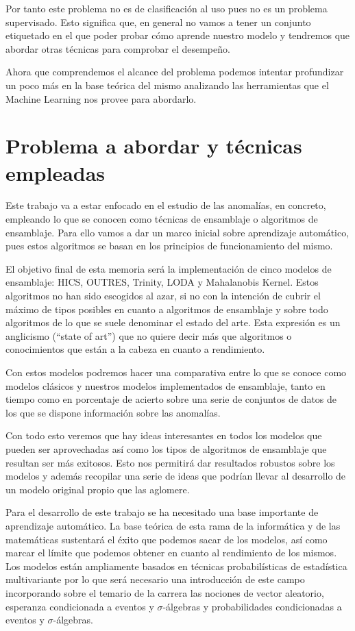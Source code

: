 Por tanto este problema no es de clasificación al uso pues no es un problema supervisado. Esto significa que, en general no vamos a tener un conjunto etiquetado en el que poder probar cómo aprende nuestro modelo y tendremos que abordar otras técnicas para comprobar el desempeño.

Ahora que comprendemos el alcance del problema podemos intentar profundizar un poco más en la base teórica del mismo analizando las herramientas que el Machine Learning nos provee para abordarlo.

\section{Problema a abordar y técnicas empleadas}

Este trabajo va a estar enfocado en el estudio de las anomalías, en concreto, empleando lo que se conocen como técnicas de ensamblaje o algoritmos de ensamblaje. Para ello vamos a dar un marco inicial sobre aprendizaje automático, pues estos algoritmos se basan en los principios de funcionamiento del mismo. 

El objetivo final de esta memoria será la implementación de cinco modelos de ensamblaje: HICS, OUTRES, Trinity, LODA y Mahalanobis Kernel. Estos algoritmos no han sido escogidos al azar, si no con la intención de cubrir el máximo de tipos posibles en cuanto a algoritmos de ensamblaje y sobre todo algoritmos de lo que se suele denominar el estado del arte. Esta expresión es un anglicismo (``state of art'') que no quiere decir más que algoritmos o conocimientos que están a la cabeza en cuanto a rendimiento.

Con estos modelos podremos hacer una comparativa entre lo que se conoce como modelos clásicos y nuestros modelos implementados de ensamblaje, tanto en tiempo como en porcentaje de acierto sobre una serie de conjuntos de datos de los que se dispone información sobre las anomalías.

Con todo esto veremos que hay ideas interesantes en todos los modelos que pueden ser aprovechadas así como los tipos de algoritmos de ensamblaje que resultan ser más exitosos. Esto nos permitirá dar resultados robustos sobre los modelos y además recopilar una serie de ideas que podrían llevar al desarrollo de un modelo original propio que las aglomere.

Para el desarrollo de este trabajo se ha necesitado una base importante de aprendizaje automático. La base teórica de esta rama de la informática y de las matemáticas sustentará el éxito que podemos sacar de los modelos, así como marcar el límite que podemos obtener en cuanto al rendimiento de los mismos. Los modelos están ampliamente basados en técnicas probabilísticas de estadística multivariante por lo que será necesario una introducción de este campo incorporando sobre el temario de la carrera las nociones de vector aleatorio, esperanza condicionada a eventos y $\sigma$-álgebras y probabilidades condicionadas a eventos y $\sigma$-álgebras.


